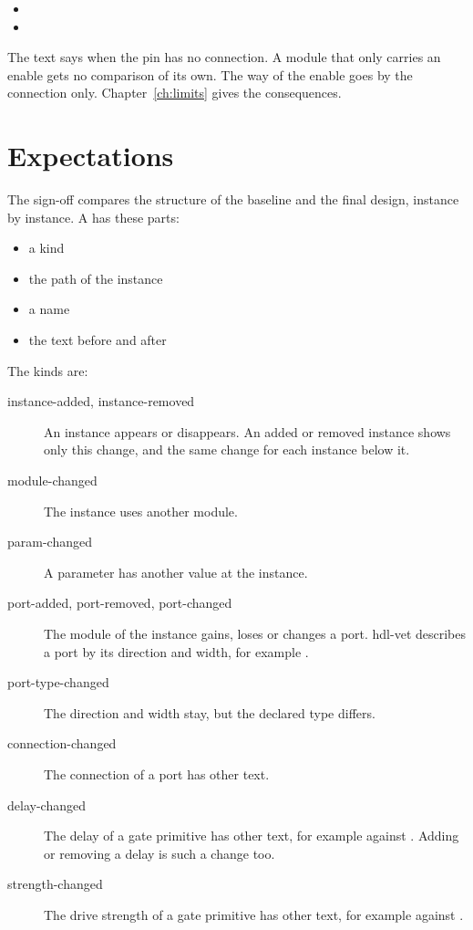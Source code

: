 \begin{itemize}
\item {}
\item {}
\end{itemize}

The text says  when the pin has no connection. A module that only
carries an enable gets no comparison of its own. The way of the enable goes by the
connection only. Chapter~\ref{ch:limits} gives the consequences.

\section{Expectations}

The sign-off compares the structure of the baseline and the final design, instance by
instance. A  has these parts:

\begin{itemize}
\item a kind
\item the path of the instance
\item a name
\item the text before and after
\end{itemize}

The kinds are:

\begin{description}
\item[instance-added, instance-removed] An instance appears or disappears. An added or
  removed instance shows only this change, and the same change for each instance
  below it.
\item[module-changed] The instance uses another module.
\item[param-changed] A parameter has another value at the instance.
\item[port-added, port-removed, port-changed] The module of the instance gains, loses or
  changes a port. hdl-vet describes a port by its direction and width, for example
  .
\item[port-type-changed] The direction and width stay, but the declared type differs.
\item[connection-changed] The connection of a port has other text.
\item[delay-changed] The delay of a gate primitive has other text, for example
   against . Adding or removing a delay is such a change too.
\item[strength-changed] The drive strength of a gate primitive has other text, for
  example  against .
\end{description}


